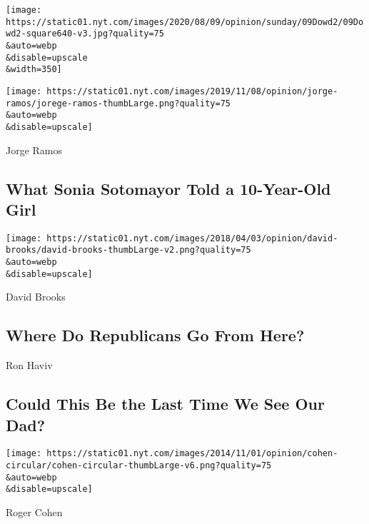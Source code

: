 \href{/2020/08/08/opinion/sunday/biden-vice-president-geraldine-ferraro.html}{}

\texttt{[image: https://static01.nyt.com/images/2020/08/09/opinion/sunday/09Dowd2/09Dowd2-square640-v3.jpg?quality=75\\\&auto=webp\\\&disable=upscale\\\&width=350]}

\href{/2020/08/07/opinion/latina-women-politics.html}{}

\texttt{[image: https://static01.nyt.com/images/2019/11/08/opinion/jorge-ramos/jorege-ramos-thumbLarge.png?quality=75\\\&auto=webp\\\&disable=upscale]}

Jorge Ramos

\hypertarget{what-sonia-sotomayor-told-a-10-year-old-girl}{%
\subsection{What Sonia Sotomayor Told a 10-Year-Old
Girl}\label{what-sonia-sotomayor-told-a-10-year-old-girl}}

\href{/2020/08/07/opinion/sunday/republican-party-trump-2020.html}{}

\texttt{[image: https://static01.nyt.com/images/2018/04/03/opinion/david-brooks/david-brooks-thumbLarge-v2.png?quality=75\\\&auto=webp\\\&disable=upscale]}

David Brooks

\hypertarget{where-do-republicans-go-from-here}{%
\subsection{Where Do Republicans Go From
Here?}\label{where-do-republicans-go-from-here}}

\href{/2020/08/06/opinion/sunday/coronavirus-baruch-haviv-death.html}{}

Ron Haviv

\hypertarget{could-this-be-the-last-time-we-see-our-dad}{%
\subsection{Could This Be the Last Time We See Our
Dad?}\label{could-this-be-the-last-time-we-see-our-dad}}

\href{/2020/08/07/opinion/beirut-explosion.html}{}

\texttt{[image: https://static01.nyt.com/images/2014/11/01/opinion/cohen-circular/cohen-circular-thumbLarge-v6.png?quality=75\\\&auto=webp\\\&disable=upscale]}

Roger Cohen

